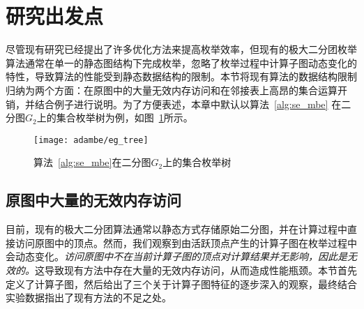 \section{研究出发点}

尽管现有研究已经提出了许多优化方法来提高枚举效率，但现有的极大二分团枚举算法通常在单一的静态图结构下完成枚举，忽略了枚举过程中计算子图动态变化的特性，导致算法的性能受到静态数据结构的限制。本节将现有算法的数据结构限制归纳为两个方面：在原图中的大量无效内存访问和在邻接表上高昂的集合运算开销，并结合例子进行说明。为了方便表述，本章中默认以算法~\ref{alg:se_mbe} 在二分图$G_2$上的集合枚举树为例，如图~\ref{fig:ada_tree}所示。



\begin{figure} [t]
	\centering
  \vspace{0.1in}
	\texttt{[image: adambe/eg\_tree]}
  \vspace{0.2in}
	\caption{算法~\ref{alg:se_mbe}在二分图$G_2$上的集合枚举树}

	\label{fig:ada_tree}
\end{figure}

\subsection{原图中大量的无效内存访问}
\label{subsec:ada_limitation_vertex}

目前，现有的极大二分团算法通常以静态方式存储原始二分图，并在计算过程中直接访问原图中的顶点。然而，我们观察到由活跃顶点产生的计算子图在枚举过程中会动态变化。\emph{访问原图中不在当前计算子图的顶点对计算结果并无影响，因此是无效的。}这导致现有方法中存在大量的无效内存访问，从而造成性能瓶颈。本节首先定义了计算子图，然后给出了三个关于计算子图特征的逐步深入的观察，最终结合实验数据指出了现有方法的不足之处。

